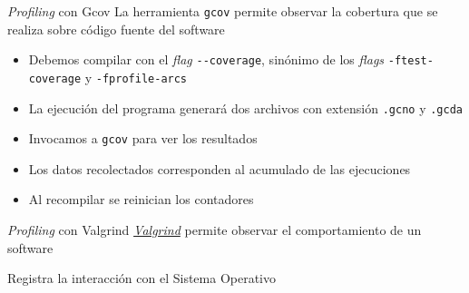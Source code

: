 \begin{frame}[fragile]{\emph{Profiling} con Gcov}
    La herramienta \verb|gcov| permite observar la cobertura que se realiza sobre código fuente del software
    \begin{itemize}
        \item Debemos compilar con el \emph{flag} \verb|--coverage|, sinónimo de los \emph{flags} \verb|-ftest-coverage| y \verb|-fprofile-arcs|
        \item La ejecución del programa generará dos archivos con extensión \verb|.gcno| y \verb|.gcda|
        \item Invocamos a \verb|gcov| para ver los resultados
        \item Los datos recolectados corresponden al acumulado de las ejecuciones
        \item Al recompilar se reinician los contadores
    \end{itemize}
\end{frame}

\begin{frame}[fragile]{\emph{Profiling} con Valgrind}
    \href{https://valgrind.org/}{\emph{Valgrind}} permite observar el comportamiento de un software
    \begin{center}
        
    \end{center}
    Registra la interacción con el Sistema Operativo
\end{frame}

